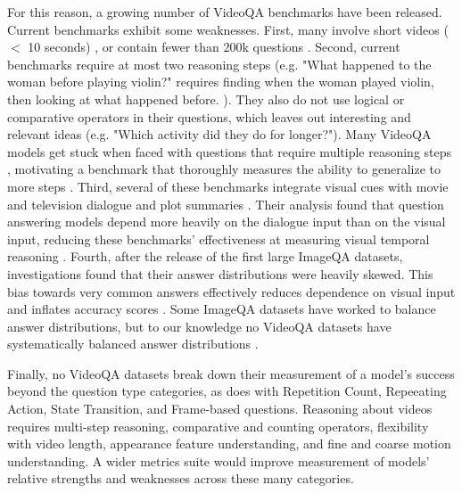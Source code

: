 \documentclass{article}
\newcommand{\mgm}[1]{{\color{cyan}{mgm: #1}}}
\begin{document}
For this reason, a growing number of VideoQA benchmarks have been released. Current benchmarks exhibit some weaknesses. First, many involve short videos ($<$ 10 seconds) \cite{jang2017tgif, kim2017deepstory, xu2017video, maharaj2017dataset}, or contain fewer than 200k questions \mgm{what counts as small?} \cite{tapaswi2016movieqa, lei2018tvqa, kim2017deepstory, xu2017video, jang2017tgif, yu2019activitynet, zeng2016leveraging}. Second, current benchmarks require at most two reasoning steps (e.g. "What happened to the woman before playing violin?" requires finding when the woman played violin, then looking at what happened before. \cite{yu2019activitynet}). They also do not use logical or comparative operators in their questions, which leaves out interesting and relevant ideas (e.g. "Which activity did they do for longer?"). Many VideoQA models get stuck when faced with questions that require multiple reasoning steps \cite{fan2019heterogeneous}, motivating a benchmark that thoroughly measures the ability to generalize to more steps \mgm{rephrase last part}. Third, several of these benchmarks integrate visual cues with movie and television dialogue and plot summaries \cite{lei2018tvqa, tapaswi2016movieqa, kim2017deepstory}. Their analysis found that question answering models depend more heavily on the dialogue input than on the visual input, reducing these benchmarks' effectiveness at measuring visual temporal reasoning \cite{tapaswi2016movieqa, lei2018tvqa}. Fourth, after the release of the first large ImageQA datasets, investigations found that their answer distributions were heavily skewed.  This bias towards very common answers effectively reduces dependence on visual input and inflates accuracy scores \cite{goyal2017making, hudson2019gqa}. Some ImageQA datasets have worked to balance answer distributions, but to our knowledge no VideoQA datasets have systematically balanced answer distributions \cite{goyal2017making, hudson2019gqa}. 

\mgm{Is this a useful thing to include: Few questions in existing benchmarks focus specifically on object manipulation through videos.} 

Finally, no VideoQA datasets break down their measurement of a model's success beyond the question type categories, as \cite{jang2017tgif} does with Repetition Count, Repeeating Action, State Transition, and Frame-based questions. Reasoning about videos requires multi-step reasoning, comparative and counting operators, flexibility with video length, appearance feature understanding, and fine and coarse motion understanding. A wider metrics suite would improve measurement of models' relative strengths and weaknesses across these many categories.
\end{document}
